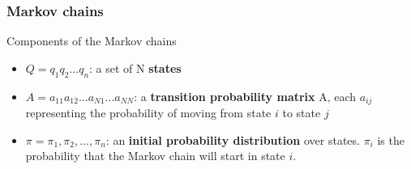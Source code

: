 \documentclass[13.5pt,aspecratio=169]{beamer}
\begin{document}
\begin{frame}
    \onehalfspacing
        \frametitle{Markov chains}
        
        \begin{block}{Components of the Markov chains}
            \begin{itemize}
                \item $Q = q_1 q_2 ... q_n$: a set of N \textbf{states}
                \item $A = a_{11} a_{12} ... a_{N1} ... a_{NN}$: a \textbf{transition probability matrix} A, each $a_{ij}$ representing the probability of moving from state $i$ to state $j$
                \item $\pi = \pi_1, \pi_2,...,\pi_n$:  an \textbf{initial probability distribution} over states. $\pi_i$ is the
                probability that the Markov chain will start in state $i$.
            \end{itemize}
        \end{block}
        
\end{frame}
\end{document}
